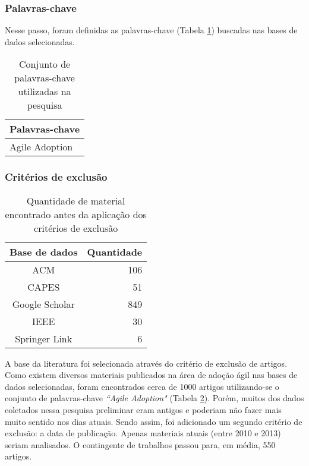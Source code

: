 %
%
%

\subsubsection{Palavras-chave}

Nesse passo, foram definidas as palavras-chave (Tabela \ref{tab:palavrasChave}) buscadas nas bases de dados selecionadas.

\begin{table}[H]
	\centering
	\begin{tabular}{| l |} \hline \textbf{Palavras-chave} \\ \hline
		Agile Adoption \\ \hline
	\end{tabular}
	\caption{Conjunto de palavras-chave utilizadas na pesquisa}
	\label{tab:palavrasChave}
\end{table}

\subsubsection{Critérios de exclusão}

\begin{table}[H]
	\centering
	\begin{tabular}{| c | r |} \hline \textbf{Base de dados}  & \textbf{Quantidade} \\ \hline
		ACM & 106 \\ \hline
		CAPES & 51 \\ \hline
		Google Scholar & 849 \\ \hline
		IEEE & 30 \\ \hline
		Springer Link & 6 \\
		\hline
	\end{tabular}
	\captionsetup{justification=centering}
	\caption{Quantidade de material encontrado antes da aplicação dos critérios de exclusão}
	\label{tab:quantidadeDeMateriaisAntes}
\end{table}

A base da literatura foi selecionada através do critério de exclusão de artigos. Como existem diversos materiais publicados na área de adoção ágil nas bases de dados selecionadas, foram encontrados cerca de 1000 artigos utilizando-se o conjunto de palavras-chave \textit{``Agile Adoption"} (Tabela \ref{tab:quantidadeDeMateriaisAntes}). Porém, muitos dos dados coletados nessa pesquisa preliminar eram antigos e poderiam não fazer mais muito sentido nos dias atuais. Sendo assim, foi adicionado um segundo critério de exclusão: a data de publicação. Apenas materiais atuais (entre 2010 e 2013) seriam analisados. O contingente de trabalhos passou para, em média, 550 artigos.

